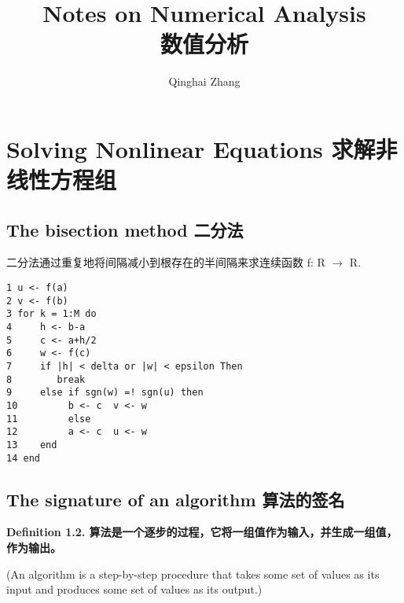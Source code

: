 \documentclass{ctexart}
\title{Notes on Numerical Analysis \\ 数值分析}
\author{Qinghai Zhang}
\begin{document}
\maketitle
\tableofcontents
{}

\section{Solving Nonlinear Equations 求解非线性方程组}
\subsection{The bisection method 二分法}
二分法通过重复地将间隔减小到根存在的半间隔来求连续函数 f: R $\rightarrow$ R.

\begin{verbatim}
1 u <- f(a)
2 v <- f(b)
3 for k = 1:M do
4     h <- b-a
5     c <- a+h/2
6     w <- f(c)
7     if |h| < delta or |w| < epsilon Then
8        break
9     else if sgn(w) =! sgn(u) then
10         b <- c  v <- w
11         else
12         a <- c  u <- w
13    end
14 end
\end{verbatim}

\subsection{The signature of an algorithm 算法的签名}
\textbf{Definition 1.2. 算法是一个逐步的过程，它将一组值作为输入，并生成一组值，作为输出。}

(An algorithm is a step-by-step procedure that takes some set of values as its input and produces some set of values as its output.)
\end{document}
